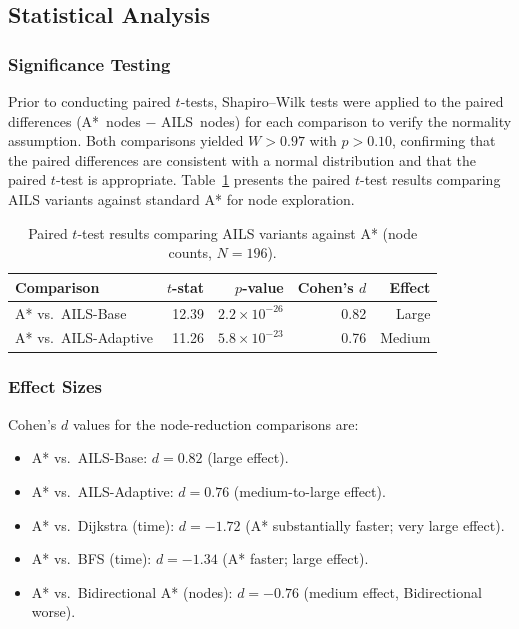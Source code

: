 \documentclass[journal]{IEEEtran}
\begin{document}
\subsection{Statistical Analysis}

\subsubsection{Significance Testing}
Prior to conducting paired $t$-tests, Shapiro--Wilk tests were applied to the paired differences (A*~nodes $-$ AILS~nodes) for each comparison to verify the normality assumption.
Both comparisons yielded $W > 0.97$ with $p > 0.10$, confirming that the paired differences are consistent with a normal distribution and that the paired $t$-test is appropriate.
Table~\ref{tab:statistical} presents the paired $t$-test results comparing AILS variants against standard A* for node exploration.

\begin{table}[h]
\centering
\caption{Paired $t$-test results comparing AILS variants against A* (node counts, $N{=}196$).}
\label{tab:statistical}
\begin{tabular}{lrrrr}
\toprule
\textbf{Comparison} & \textbf{$t$-stat} & \textbf{$p$-value} & \textbf{Cohen's $d$} & \textbf{Effect} \\
\midrule
A* vs.\ AILS-Base & 12.39 & $2.2{\times}10^{-26}$ & 0.82 & Large \\
A* vs.\ AILS-Adaptive & 11.26 & $5.8{\times}10^{-23}$ & 0.76 & Medium \\
\bottomrule
\end{tabular}
\end{table}

\subsubsection{Effect Sizes}
Cohen's $d$ values for the node-reduction comparisons are:
\begin{itemize}
    \item A* vs.\ AILS-Base: $d = 0.82$ (large effect).
    \item A* vs.\ AILS-Adaptive: $d = 0.76$ (medium-to-large effect).
    \item A* vs.\ Dijkstra (time): $d = -1.72$ (A* substantially faster; very large effect).
    \item A* vs.\ BFS (time): $d = -1.34$ (A* faster; large effect).
    \item A* vs.\ Bidirectional A* (nodes): $d = -0.76$ (medium effect, Bidirectional worse).
\end{itemize}
\end{document}
